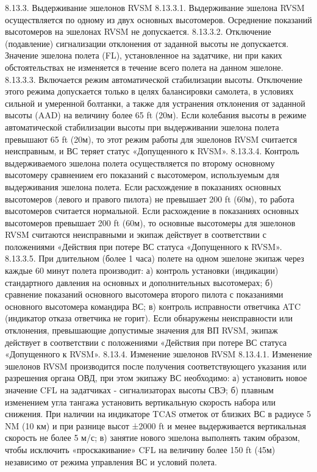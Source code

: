 8.13.3.	Выдерживание эшелонов RVSM
8.13.3.1. Выдерживание эшелона RVSM осуществляется по одному из двух основных высотомеров. Осреднение показаний высотомеров на эшелонах RVSM не допускается.
8.13.3.2. Отключение (подавление) сигнализации отклонения от заданной высоты не допускается. Значение эшелона полета (FL), установленное на задатчике, ни при каких обстоятельствах не изменяется в течение всего полета на данном эшелоне.
8.13.3.3. Включается режим автоматической стабилизации высоты. Отключение этого режима допускается только в целях балансировки самолета, в условиях сильной и умеренной болтанки, а также для устранения отклонения от заданной высоты (AAD) на величину более 65 ft (20м). Если колебания высоты в режиме автоматической стабилизации высоты при выдерживании эшелона полета превышают 65 ft (20м), то этот режим работы для эшелонов RVSM считается неисправным, и ВС теряет статус «Допущенного к RVSM».
8.13.3.4. Контроль выдерживаемого эшелона полета осуществляется по второму основному высотомеру сравнением его показаний с высотомером, используемым для выдерживания эшелона полета.
Если расхождение в показаниях основных высотомеров (левого и правого пилота) не превышает 200 ft (60м), то работа высотомеров считается нормальной. Если расхождение в показаниях основных высотомеров превышает 200 ft (60м), то основные высотомеры для эшелонов RVSM считаются неисправными и экипаж действует в соответствии с положениями «Действия при потере ВС статуса «Допущенного к RVSM».
8.13.3.5. При длительном (более 1 часа) полете на одном эшелоне экипаж через каждые 60 минут полета производит:
а)	контроль установки (индикации) стандартного давления на основных и дополнительных высотомерах;
б)	сравнение показаний основного высотомера второго пилота с показаниями основного высотомера командира ВС;
в)	контроль исправности ответчика ATC (индикатор отказа ответчика не горит).
Если обнаружены неисправности или отклонения, превышающие допустимые значения для ВП RVSM, экипаж действует в соответствии с положениями «Действия при потере ВС статуса «Допущенного к RVSM».
8.13.4.	Изменение эшелонов RVSM
8.13.4.1. Изменение эшелонов RVSM производится после получения соответствующего указания или разрешения органа ОВД, при этом экипажу ВС необходимо:
а)	установить новое значение CFL на задатчиках - сигнализаторах высоты СВЭ;
б)	плавным изменением угла тангажа установить вертикальную скорость набора или снижения. При наличии на индикаторе TCAS отметок от близких ВС в радиусе 5 NM (10 км) и при разнице высот ±2000 ft и менее выдерживается вертикальная скорость не более 5 м/с;
в)	занятие нового эшелона выполнять таким образом, чтобы исключить «проскакивание» CFL на величину более 150 ft (45м) независимо от режима управления ВС и условий полета.
